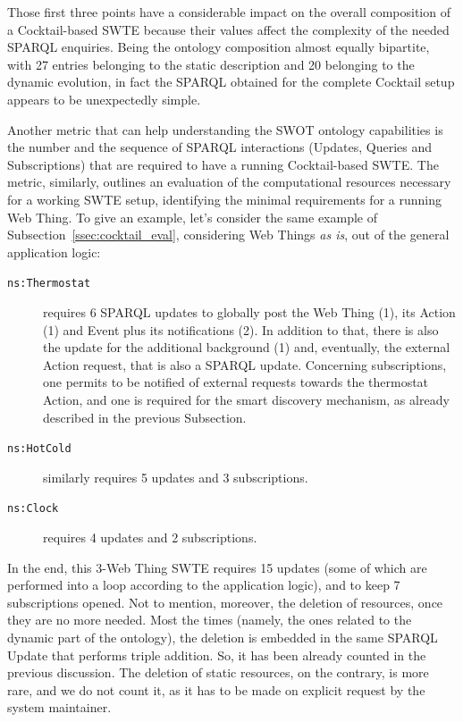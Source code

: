 Those first three points have a considerable impact on the overall composition of a Cocktail-based SWTE because their values affect the complexity of the needed SPARQL enquiries. Being the ontology composition almost equally bipartite, with 27 entries belonging to the static description and 20 belonging to the dynamic evolution, in fact the SPARQL obtained for the complete Cocktail setup appears to be unexpectedly simple. 

Another metric that can help understanding the SWOT ontology capabilities is the number and the sequence of SPARQL interactions (Updates, Queries and Subscriptions) that are required to have a running Cocktail-based SWTE. The metric, similarly, outlines an evaluation of the computational resources necessary for a working SWTE setup, identifying the minimal requirements for a running Web Thing. To give an example, let's consider the same example of Subsection~\ref{ssec:cocktail_eval}, considering Web Things \textit{as is}, out of the general application logic:


\begin{description}
    \item[\texttt{ns:Thermostat}] requires 6 SPARQL updates to globally post the Web Thing (1), its Action (1) and Event plus its notifications (2). In addition to that, there is also the update for the additional background (1) and, eventually, the external Action request, that is also a SPARQL update. Concerning subscriptions, one permits to be notified of external requests towards the thermostat Action, and one is required for the smart discovery mechanism, as already described in the previous Subsection.
    \item[\texttt{ns:HotCold}] similarly requires 5 updates and 3 subscriptions.
    \item[\texttt{ns:Clock}] requires 4 updates and 2 subscriptions.
\end{description}
In the end, this 3-Web Thing SWTE requires 15 updates (some of which are performed into a loop according to the application logic), and to keep 7 subscriptions opened. Not to mention, moreover, the deletion of resources, once they are no more needed. Most the times (namely, the ones related to the dynamic part of the ontology), the deletion is embedded in the same SPARQL Update that performs triple addition. So, it has been already counted in the previous discussion. The deletion of static resources, on the contrary, is more rare, and we do not count it, as it has to be made on explicit request by the system maintainer.


